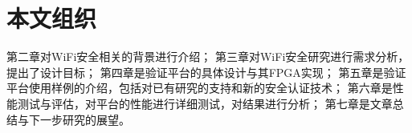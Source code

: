 	\section{本文组织}
	第二章对WiFi安全相关的背景进行介绍；
	第三章对WiFi安全研究进行需求分析，提出了设计目标；
	第四章是验证平台的具体设计与其FPGA实现；
	第五章是验证平台使用样例的介绍，包括对已有研究的支持和新的安全认证技术；
	第六章是性能测试与评估，对平台的性能进行详细测试，对结果进行分析；
	第七章是文章总结与下一步研究的展望。
